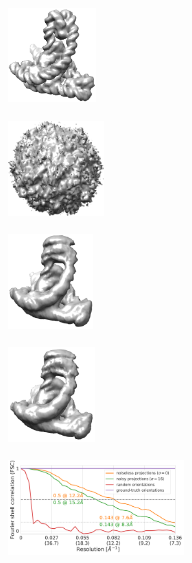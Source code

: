 \begin{figure}[t]
    \begin{subfigure}[b]{0.17\linewidth}
        \centering
        \includegraphics[height=2.5cm]{figures/5j0n_fullcvg_uniformS2_noise0_gt.png}
        \caption{}\label{fig:5j0n-noise0-reconstruction-true}
    \end{subfigure}
    \hfill
    \begin{subfigure}[b]{0.16\linewidth}
        \centering
        \includegraphics[height=2.5cm]{figures/5j0n_fullcvg_uniformS2_noise0_rand.png}
        \caption{}
    \end{subfigure}
    \hfill
    \begin{subfigure}[b]{0.15\linewidth}
        \centering
        \includegraphics[height=2.5cm]{figures/5j0n_fullcvg_uniformS2_noise0_apr.png}
        \caption{}\label{fig:5j0n-noise0-reconstruction-recovered}
    \end{subfigure}
    \hfill
    \begin{subfigure}[b]{0.15\linewidth}
        \centering
        \includegraphics[height=2.5cm]{figures/5j0n_fullcvg_uniformS2_noise16_apr.png}
        \caption{}\label{fig:5j0n-noise16-reconstruction-recovered}
    \end{subfigure}
    \hfill
    \begin{subfigure}[b]{0.30\linewidth}
        \centering
        \includegraphics[height=2.5cm]{figures/5j0n_fullcvg_uniformS2_FSC_apr_init_customFSC2.pdf}
        \caption{}
    \end{subfigure}


\end{figure}
